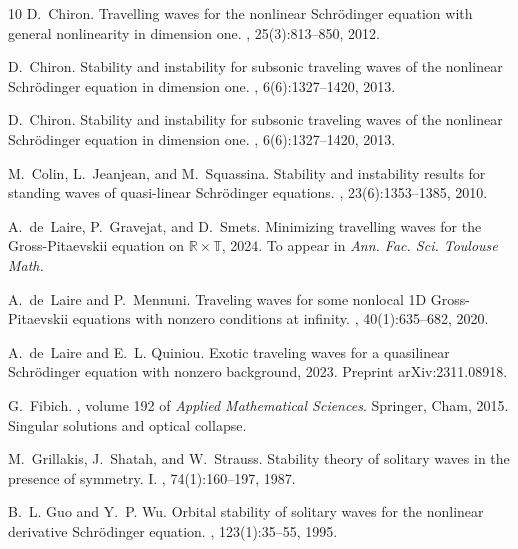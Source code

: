 \documentclass[11pt]{article}
\theoremstyle{plain}
\theoremstyle{definition}
\theoremstyle{remark}
\numberwithin{equation}{section}
\begin{document}
{\begin{thebibliography}{10}
	D.~Chiron.
	\newblock Travelling waves for the nonlinear {S}chr\"odinger equation with
	general nonlinearity in dimension one.
	, 25(3):813--850, 2012.
	
	D.~Chiron.
	\newblock Stability and instability for subsonic traveling waves of the
	nonlinear {S}chr\"{o}dinger equation in dimension one.
	, 6(6):1327--1420, 2013.
	
	D.~Chiron.
	\newblock Stability and instability for subsonic traveling waves of the
	nonlinear {S}chr\"odinger equation in dimension one.
	, 6(6):1327--1420, 2013.
	
	M.~Colin, L.~Jeanjean, and M.~Squassina.
	\newblock Stability and instability results for standing waves of quasi-linear
	{S}chr\"{o}dinger equations.
	, 23(6):1353--1385, 2010.
	
	A.~de~Laire, P.~Gravejat, and D.~Smets.
	\newblock Minimizing travelling waves for the {Gross}-{Pitaevskii} equation on
	$\mathbb{R} \times \mathbb{T}$, 2024.
	\newblock To appear in \textit{Ann. Fac. Sci. Toulouse Math.}
	
	A.~de~Laire and P.~Mennuni.
	\newblock Traveling waves for some nonlocal 1{D} {G}ross-{P}itaevskii equations
	with nonzero conditions at infinity.
	, 40(1):635--682, 2020.
	
	A.~de~Laire and E.~L. Quiniou.
	\newblock Exotic traveling waves for a quasilinear {S}chr\"odinger equation
	with nonzero background, 2023.
	\newblock Preprint arXiv:2311.08918.
	
	G.~Fibich.
	, volume 192 of {\em
		Applied Mathematical Sciences}.
	\newblock Springer, Cham, 2015.
	\newblock Singular solutions and optical collapse.
	
	M.~Grillakis, J.~Shatah, and W.~Strauss.
	\newblock Stability theory of solitary waves in the presence of symmetry. {I}.
	, 74(1):160--197, 1987.
	
	B.~L. Guo and Y.~P. Wu.
	\newblock Orbital stability of solitary waves for the nonlinear derivative
	{S}chr\"{o}dinger equation.
	, 123(1):35--55, 1995.
	

\end{thebibliography}}
\end{document}
